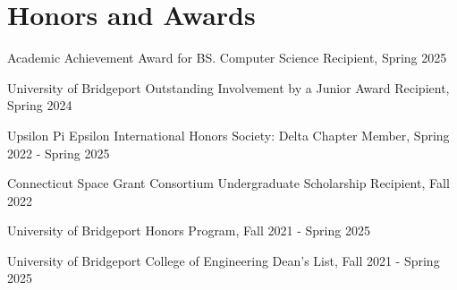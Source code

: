\section{Honors and Awards}      
\vspace{-0.30 cm}
    \begin{onecolentry}
        \item Academic Achievement Award for BS. Computer Science Recipient, Spring 2025
        \item University of Bridgeport Outstanding Involvement by a Junior Award Recipient, Spring 2024
        \item Upsilon Pi Epsilon International Honors Society: Delta Chapter Member, Spring 2022 - Spring 2025
        \item Connecticut Space Grant Consortium Undergraduate Scholarship Recipient, Fall 2022
        \item University of Bridgeport Honors Program, Fall 2021 - Spring 2025
        \item University of Bridgeport College of Engineering Dean's List, Fall 2021 - Spring 2025
    \end{onecolentry}